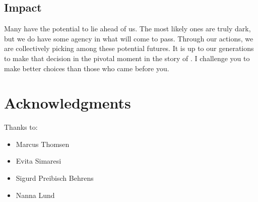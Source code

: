 \subsection{Impact}

Many  have the potential to lie ahead of us. The most likely ones are truly dark, but we do have some agency in what will come to pass. Through our actions, we are collectively picking among these potential futures. It is up to our generations to make that decision in the pivotal moment in the story of . I challenge you to make better choices than those who came before you.

\section{Acknowledgments}

Thanks to:
\begin{itemize}
  \item Marcus Thomsen
  \item Evita Simaresi
  \item Sigurd Preibisch Behrens
  \item Nanna Lund
\end{itemize}

